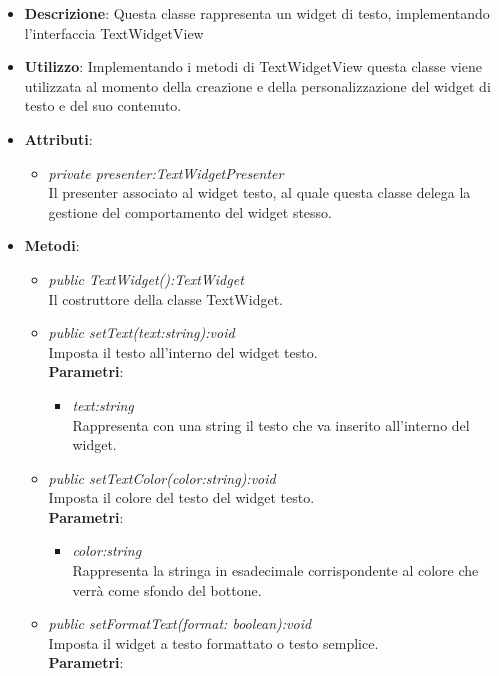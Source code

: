 \begin{itemize}
\item \textbf{Descrizione}: Questa classe rappresenta un widget di testo, implementando l'interfaccia TextWidgetView
\item \textbf{Utilizzo}: Implementando i metodi di TextWidgetView questa classe viene utilizzata al momento della creazione e della personalizzazione del widget di testo e del suo contenuto.
\item \textbf{Attributi}:
	\begin{itemize}
	\item \textit{private presenter:TextWidgetPresenter}\\
	Il presenter associato al widget testo, al quale questa classe delega la gestione del comportamento del widget stesso.
	\end{itemize}
\item \textbf{Metodi}:
	\begin{itemize}
	\item \textit{public TextWidget():TextWidget}\\
	Il costruttore della classe TextWidget.
	\item \textit{public setText(text:string):void}\\
	Imposta il testo all'interno del widget testo.
		\\ \textbf{Parametri}: \begin{itemize}
		\item \textit{text:string}\\
		Rappresenta con una string il testo che va inserito all'interno del widget.
		\end{itemize} 
	\item \textit{public setTextColor(color:string):void}\\
	Imposta il colore del testo del widget testo.
		\\ \textbf{Parametri}: \begin{itemize}
		\item \textit{color:string}\\
		Rappresenta la stringa in esadecimale corrispondente al colore che verrà come sfondo del bottone.
		\end{itemize} 
	\item \textit{public setFormatText(format: boolean):void}\\
	Imposta il widget a testo formattato o testo semplice.
		\\ \textbf{Parametri}: \begin{itemize}

\end{itemize}
\end{itemize}
\end{itemize}

